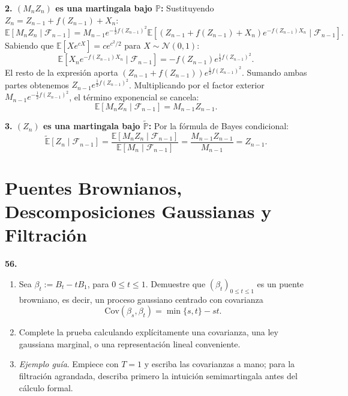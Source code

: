 \documentclass[11pt, letterpaper]{article}
\begin{document}
\begin{solucion}
    \textbf{2. $(M_n Z_n)$ es una martingala bajo $\mathbb{P}$:}
    Sustituyendo $Z_n = Z_{n-1} + f(Z_{n-1}) + X_n$:
    \[ \mathbb{E}[M_n Z_n \mid \mathcal{F}_{n-1}] = M_{n-1} e^{-\frac{1}{2}f(Z_{n-1})^2} \mathbb{E}\left[ (Z_{n-1} + f(Z_{n-1}) + X_n) e^{-f(Z_{n-1})X_n} \mid \mathcal{F}_{n-1} \right]. \]
    Sabiendo que $\mathbb{E}[X e^{cX}] = c e^{c^2/2}$ para $X \sim \mathcal{N}(0,1)$:
    \[ \mathbb{E}\left[ X_n e^{-f(Z_{n-1})X_n} \mid \mathcal{F}_{n-1} \right] = -f(Z_{n-1}) e^{\frac{1}{2}f(Z_{n-1})^2}. \]
    El resto de la expresión aporta $(Z_{n-1} + f(Z_{n-1})) e^{\frac{1}{2}f(Z_{n-1})^2}$. Sumando ambas partes obtenemos $Z_{n-1} e^{\frac{1}{2}f(Z_{n-1})^2}$.
    Multiplicando por el factor exterior $M_{n-1} e^{-\frac{1}{2}f(Z_{n-1})^2}$, el término exponencial se cancela:
    \[ \mathbb{E}[M_n Z_n \mid \mathcal{F}_{n-1}] = M_{n-1} Z_{n-1}. \]

    \textbf{3. $(Z_n)$ es una martingala bajo $\tilde{\mathbb{P}}$:}
    Por la fórmula de Bayes condicional:
    \[ \tilde{\mathbb{E}}[Z_n \mid \mathcal{F}_{n-1}] = \frac{\mathbb{E}[M_n Z_n \mid \mathcal{F}_{n-1}]}{\mathbb{E}[M_n \mid \mathcal{F}_{n-1}]} = \frac{M_{n-1} Z_{n-1}}{M_{n-1}} = Z_{n-1}. \]
\end{solucion}

\newpage

\section{Puentes Brownianos, Descomposiciones Gaussianas y Filtración}

\begin{ejercicio}
    \textbf{56.} 
    \begin{enumerate}
        \item Sea $\beta_{t}:=B_{t}-tB_{1}$, para $0\le t\le 1$. Demuestre que $(\beta_{t})_{0\le t\le 1}$ es un puente browniano, es decir, un proceso gaussiano centrado con covarianza
        \[ \text{Cov}(\beta_{s},\beta_{t})=\min\{s,t\}-st. \]
        \item Complete la prueba calculando explícitamente una covarianza, una ley gaussiana marginal, o una representación lineal conveniente.
        \item \textit{Ejemplo guía}. Empiece con $T=1$ y escriba las covarianzas a mano; para la filtración agrandada, describa primero la intuición semimartingala antes del cálculo formal.
    \end{enumerate}
\end{ejercicio}
\end{document}
